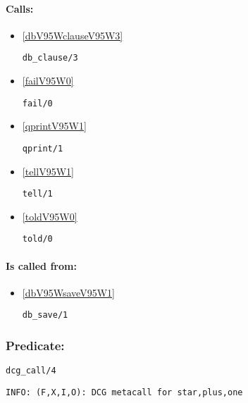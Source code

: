 \paragraph{Calls:} 
\begin{itemize}
\item \ref{dbV95WclauseV95W3} 
\begin{verbatim}
db_clause/3
\end{verbatim}

\item \ref{failV95W0} 
\begin{verbatim}
fail/0
\end{verbatim}

\item \ref{qprintV95W1} 
\begin{verbatim}
qprint/1
\end{verbatim}

\item \ref{tellV95W1} 
\begin{verbatim}
tell/1
\end{verbatim}

\item \ref{toldV95W0} 
\begin{verbatim}
told/0
\end{verbatim}

\end{itemize}
\paragraph{Is called from:} 
\begin{itemize}
\item \ref{dbV95WsaveV95W1} 
\begin{verbatim}
db_save/1
\end{verbatim}

\end{itemize}

\subsubsection{Predicate:} \label{dcgV95WcallV95W4}

\begin{verbatim}
dcg_call/4
\end{verbatim}

{\small \begin{verbatim}
INFO: (F,X,I,O): DCG metacall for star,plus,one

\end{verbatim}}
